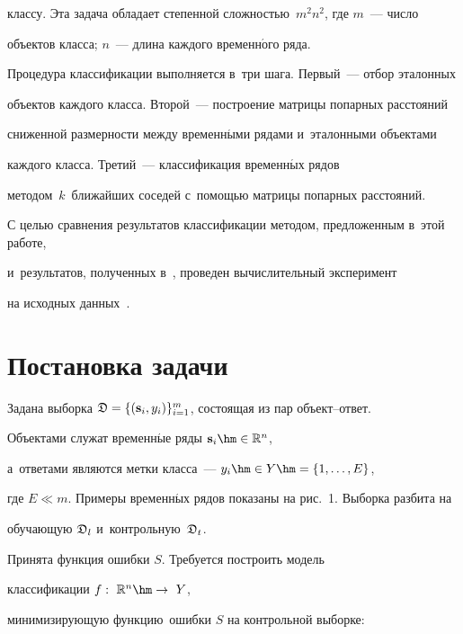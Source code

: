 классу. Эта задача обладает степенной сложностью~$m^2n^2$, где $m$~--- число 

объектов класса; $n$~--- длина каждого временн$\acute{\mbox{о}}$го ряда.



Процедура классификации выполняется в~три шага. Первый~--- отбор эталонных 

объектов каждого класса. Второй~--- построение матрицы попарных расстояний 

сниженной размерности между временн$\acute{\mbox{ы}}$ми рядами и~эталонными объектами 

каждого класса. Третий~--- классификация временн$\acute{\mbox{ы}}$х рядов 

методом~$k$~ближайших соседей с~по\-мощью матрицы попарных расстояний.



С целью сравнения результатов классификации методом, предложенным в~этой работе, 

и~результатов, полученных в~\cite{Popova2015}, проведен вычислительный эксперимент 

на исходных данных~\cite{Data}.



\section{Постановка задачи}



\vspace*{-2pt}



 Задана выборка $\mathfrak{D} = \{(\textbf{s}_i,y_i)\}^m_{i=1}$, состоящая из пар объект--от\-вет. 

 Объектами служат временн$\acute{\mbox{ы}}$е ряды $\textbf{s}_i \hm\in \mathbb{R}^n$, 

 а~ответами являются метки класса~--- $y_i \hm \in Y\hm =\{1,\ldots,E\}$, 

 где $E \ll m$. Примеры временн$\acute{\mbox{ы}}$х рядов показаны на рис.~1. Выборка разбита на 

 обуча\-ющую $\mathfrak{D}_l$ и~контрольную~$\mathfrak{D}_t$.



Принята функция ошибки $S$. Требуется построить модель 

классификации $f:\ \mathbb{R}^n \hm\rightarrow~Y$, 

минимизирующую функцию~ошибки $S$ на контрольной выборке:

